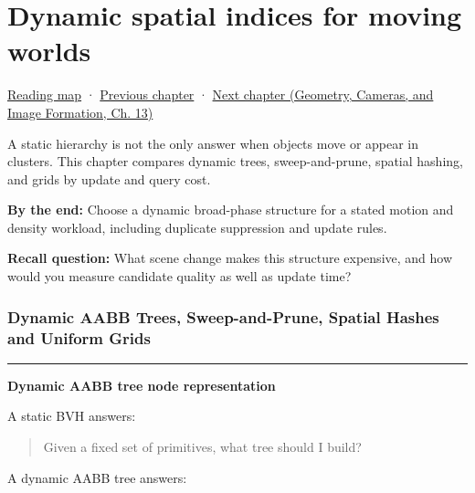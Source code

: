 \chapter{Dynamic spatial indices for moving worlds}\label{06-engine-ii-ch029-dynamic-spatial-indices-for-moving-worlds}\hypertarget{06-engine-ii-ch029}{}\label{stagechapter:06-engine-ii-ch029}

\hypertarget{06-engine-ii-ch029-dynamic-spatial-indices-for-moving-worlds}{}

\hyperref[volume-reading-map]{Reading map} · \hyperref[06-engine-ii-ch028-bvh-traversal-refitting-and-simd]{Previous chapter} · \href{../03-Geometry-Cameras-and-Image-Formation/main.pdf\#nameddest=06-engine-ii-ch030-depth-projection-and-shadow-map-precision}{Next chapter (Geometry, Cameras, and Image Formation, Ch. 13)}

A static hierarchy is not the only answer when objects move or appear in clusters. This chapter compares dynamic trees, sweep-and-prune, spatial hashing, and grids by update and query cost.

\textbf{By the end:} Choose a dynamic broad-phase structure for a stated motion and density workload, including duplicate suppression and update rules.

\textbf{Recall question:} What scene change makes this structure expensive, and how would you measure candidate quality as well as update time?

\subsection{Dynamic AABB Trees, Sweep-and-Prune, Spatial Hashes and Uniform Grids}\label{06-engine-ii-ch029-dynamic-aabb-trees-sweep-and-prune-spatial-hashes-and-uniform-grids}

\hypertarget{06-engine-ii-ch029-dynamic-aabb-trees-sweep-and-prune-spatial-hashes-and-uniform-grids}{}

\begin{center}\rule{0.5\linewidth}{0.5pt}\end{center}

\textbf{Dynamic AABB tree node representation}

A static BVH answers:

\begin{quote}
Given a fixed set of primitives, what tree should I build?
\end{quote}

A dynamic AABB tree answers:

